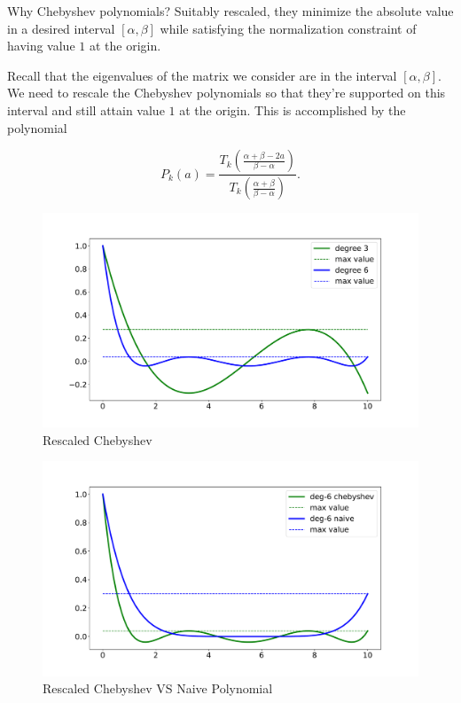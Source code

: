 Why Chebyshev polynomials? Suitably rescaled, they minimize the absolute value in a desired interval $[\alpha, \beta]$ while satisfying the normalization constraint of having value $1$ at the origin.

Recall that the eigenvalues of the matrix we consider are in the interval $[\alpha, \beta]$. We need to rescale the Chebyshev polynomials so that they're supported on this interval and still attain value $1$ at the origin. This is accomplished by the polynomial

\begin{equation*}
P_k(a) = \frac{T_k\left(\frac{\alpha + \beta - 2a}{\beta - \alpha}\right)}{T_k\left(\frac{\alpha + \beta}{\beta - \alpha}\right)}.
\end{equation*}
\begin{figure}[ht]
\includegraphics[width=15cm]{figures/lecture6-rescaled_cheb.pdf}
\centering
\caption{Rescaled Chebyshev}
\label{rescales_chebyshev}
\end{figure}

\begin{figure}[ht]
\includegraphics[width=15cm]{figures/lecture6-rescaled_cheb_vs_naive.pdf}
\centering
\caption{Rescaled Chebyshev VS Naive Polynomial}
\label{rescaled_chebyshev_vs_naive_p}
\end{figure}

